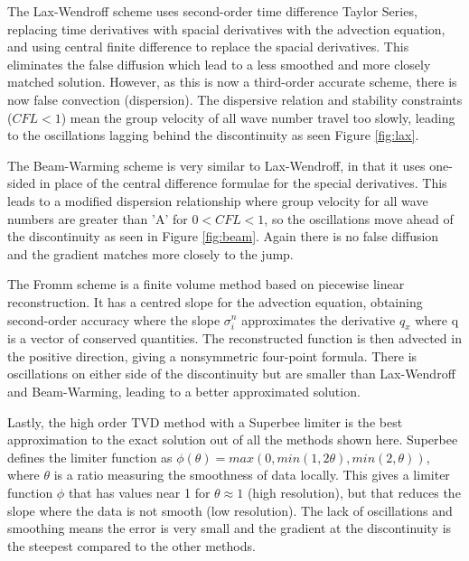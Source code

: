 \documentclass[12pt, a4paper]{article}
\begin{document}
The Lax-Wendroff scheme uses second-order time difference Taylor Series, replacing time derivatives with spacial derivatives with the advection equation, and using central finite difference to replace the spacial derivatives. This eliminates the false diffusion which lead to a less smoothed and more closely matched solution. However, as this is now a third-order accurate scheme, there is now false convection (dispersion). The dispersive relation and stability constraints ($CFL<1$) mean the group velocity of all wave number travel too slowly, leading to the oscillations lagging behind the discontinuity as seen Figure \ref{fig:lax}.

The Beam-Warming scheme is very similar to Lax-Wendroff, in that it uses one-sided in place of the central difference formulae for the special derivatives. This leads to a modified dispersion relationship where group velocity for all wave numbers are greater than 'A' for $0<CFL<1$, so the oscillations move ahead of the discontinuity as seen in Figure \ref{fig:beam}. Again there is no false diffusion and the gradient matches more closely to the jump.

The Fromm scheme is a finite volume method based on piecewise linear reconstruction. It has a centred slope for the advection equation, obtaining second-order accuracy where the slope $\sigma_{i}^{n}$ approximates the derivative $q_x$ where q is a vector of conserved quantities. The reconstructed function is then advected in the positive direction, giving a nonsymmetric four-point formula. There is oscillations on either side of the discontinuity but are smaller than Lax-Wendroff and Beam-Warming, leading to a better approximated solution.

Lastly, the high order TVD method with a Superbee limiter is the best approximation to the exact solution out of all the methods shown here.  Superbee defines the limiter function as $\phi(\theta)=max(0,min(1,2\theta),min(2,\theta))$, where $\theta$ is a ratio measuring the smoothness of data locally. This gives a limiter function $\phi$ that has values near 1 for $\theta\approx1$ (high resolution), but that reduces the slope where the data is not smooth (low resolution). The lack of oscillations and smoothing means the error is very small and the gradient at the discontinuity is the steepest compared to the other methods.
\end{document}
